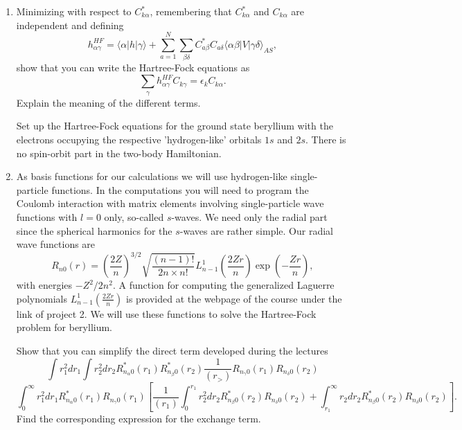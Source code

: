 \begin{prob}
\begin{enumerate}
\item
Minimizing with respect to $C^*_{k\alpha}$, remembering that $C^*_{k\alpha}$ and $C_{k\alpha}$
are independent and defining
\[
h_{\alpha\gamma}^{HF}=\langle \alpha | h | \gamma \rangle+
\sum_{a=1}^N\sum_{\beta\delta} C^*_{a\beta}C_{a\delta}\langle \alpha\beta|V|\gamma\delta\rangle_{AS},
\]
show that you can write the Hartree-Fock  equations as 
\[
\sum_{\gamma}h_{\alpha\gamma}^{HF}C_{k\gamma}=\epsilon_kC_{k\alpha}.
\]
Explain the meaning of the different terms.

Set up the Hartree-Fock equations for the ground state beryllium 
with the electrons  occupying
the respective 'hydrogen-like' orbitals $1s$ and $2s$.  
There is no spin-orbit part in the two-body Hamiltonian.
\item 
As basis functions for our calculations we will use hydrogen-like single-particle functions. 
In the computations you will need to program the Coulomb interaction with matrix elements
involving single-particle wave functions with $l=0$ only, so-called $s$-waves.
We need only the radial part since the 
spherical harmonics for the $s$-waves are rather simple.
Our radial wave functions are
\[
R_{n0}(r)=\left(\frac{2Z}{n}\right)^{3/2}\sqrt{\frac{(n-1)!}{2n\times n!}}L_{n-1}^1(\frac{2Zr}{n})\exp{(-\frac{Zr}{n})},
\]
with energies $-Z^2/2n^2$.
A function for computing the generalized Laguerre  polynomials $L_{n-1}^1(\frac{2Zr}{n})$ is provided at the webpage of
the course under the link of project 2. 
We will use these functions to solve the Hartree-Fock problem for beryllium.

Show that you can simplify the direct term developed during the lectures
\[
\int r_1^2dr_1 \int r_2^2dr_2R_{n_{\alpha}0}^*(r_1) R_{n_{\beta}0}^*(r_2) 
  \frac{1}{(r_>)}R_{n_{\gamma}0}(r_1)R_{n_{\delta}0}(r_2)
\]
\[
\int_0^{\infty} r_1^2dr_1R_{n_{\alpha}0}^*(r_1)R_{n_{\gamma}0}(r_1) 
\left[\frac{1}{(r_1)}\int_0^{r_1} r_2^2dr_2 R_{n_{\beta}0}^*(r_2) 
  R_{n_{\delta}0}(r_2)+\int_{r_1}^{\infty} r_2dr_2 R_{n_{\beta}0}^*(r_2) 
  R_{n_{\delta}0}(r_2)\right].
\]
Find the corresponding expression for the exchange term.


\end{enumerate}
\end{prob}
